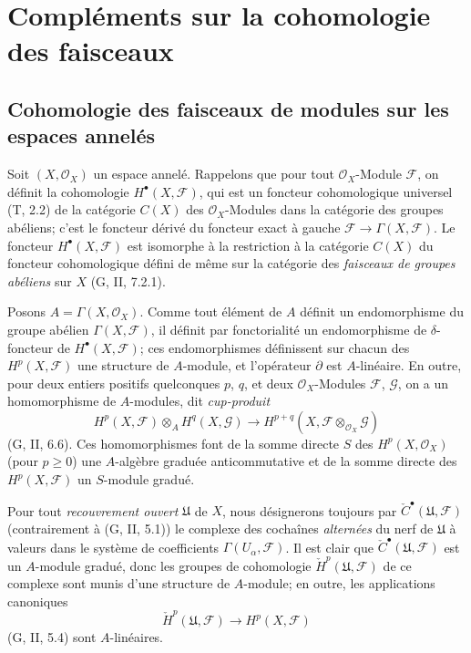 \section{Compléments sur la cohomologie des faisceaux}
\label{section:0.12-fr}

\subsection{Cohomologie des faisceaux de modules sur les espaces annelés}
\label{subsection:0.12.1-fr}

\begin{env}[12.1.1]
\label{0.12.1.1-fr}
Soit $(X,\mathcal O_X)$ un espace annelé. Rappelons que pour tout
$\mathcal O_X$-Module $\mathcal F$, on définit la cohomologie
$H^\bullet(X,\mathcal F)$, qui est un foncteur cohomologique universel
(T, 2.2) de la catégorie $C(X)$ des $\mathcal O_X$-Modules dans la catégorie
des groupes abéliens; c'est le foncteur dérivé du foncteur exact à gauche
$\mathcal F\to\Gamma(X,\mathcal F)$. Le foncteur $H^\bullet(X,\mathcal F)$
est isomorphe
à la restriction à la catégorie $C(X)$ du foncteur cohomologique défini de
même sur la catégorie des \emph{faisceaux de groupes abéliens} sur $X$
(G, II, 7.2.1).
\end{env}

\begin{env}[12.1.2]
\label{0.12.1.2-fr}
Posons $A=\Gamma(X,\mathcal O_X)$. Comme tout élément de $A$ définit un
endomorphisme du groupe abélien $\Gamma(X,\mathcal F)$, il définit par
fonctorialité un endomorphisme de $\delta$-foncteur de
$H^\bullet(X,\mathcal F)$; ces endomorphismes définissent sur chacun des
$H^p(X,\mathcal F)$ une structure de $A$-module, et l'opérateur $\partial$
est $A$-linéaire. En outre, pour deux entiers positifs quelconques $p$, $q$,
et deux $\mathcal O_X$-Modules $\mathcal F$, $\mathcal G$, on a un
homomorphisme de $A$-modules, dit \emph{cup-produit}
\[
\label{0.12.1.2.1-fr}
\tag{12.1.2.1}
H^p(X,\mathcal F)\otimes_A H^q(X,\mathcal G)
\longrightarrow H^{p+q}(X,\mathcal F\otimes_{\mathcal O_X}\mathcal G)
\]
(G, II, 6.6). Ces homomorphismes font de la somme directe $S$ des
$H^p(X,\mathcal O_X)$ (pour $p\geq0$) une $A$-algèbre graduée
anticommutative et de la somme directe des $H^p(X,\mathcal F)$ un $S$-module
gradué.

Pour tout \emph{recouvrement ouvert} $\mathfrak U$ de $X$, nous désignerons
toujours par $\check C^\bullet(\mathfrak U,\mathcal F)$ (contrairement à
(G, II, 5.1)) le complexe des cochaînes \emph{alternées} du nerf de
$\mathfrak U$ à valeurs dans le système de coefficients
$\Gamma(U_\alpha,\mathcal F)$. Il est clair que
$\check C^\bullet(\mathfrak U,\mathcal F)$ est un $A$-module gradué, donc les
groupes de cohomologie $\check H^p(\mathfrak U,\mathcal F)$ de ce complexe
sont munis d'une structure de $A$-module; en outre, les applications
canoniques
\[
\check H^p(\mathfrak U,\mathcal F)\longrightarrow H^p(X,\mathcal F)
\]
(G, II, 5.4) sont $A$-linéaires.
\end{env}

